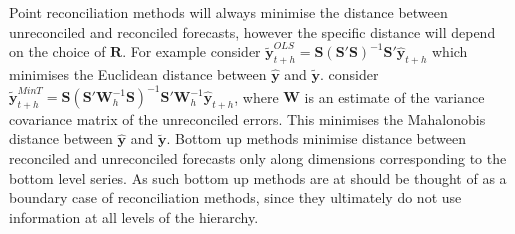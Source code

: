 \documentclass[a4paper, 11pt]{article}
\theoremstyle{theo}
\theoremstyle{definition}
\begin{document}
Point reconciliation methods will always minimise the distance between unreconciled and reconciled forecasts, however the specific distance will depend on the choice of ${\bm R}$.  For example \cite{Hyndman2011} consider $\tilde{\bm{y}}^{OLS}_{t+h}=\bm{S}(\bm{S}' \bm{S})^{-1}\bm{S}' \hat{\bm{y}}_{t+h}$ which minimises the Euclidean distance between $\hat{\bm y}$ and $\tilde{\bm y}$. \cite{Wickramasuriya2017} consider $\tilde{\bm{y}}^{MinT}_{t+h}=\bm{S}(\bm{S}' \bm{W}^{-1}_{h}\bm{S})^{-1}\bm{S}'\bm{W}^{-1}_{h} \hat{\bm{y}}_{t+h}$, where ${\bm W}$ is an estimate of the variance covariance matrix of the unreconciled errors.  This 
minimises the Mahalonobis distance between $\hat{\bm y}$ and $\tilde{\bm y}$.  Bottom up methods minimise distance between reconciled and unreconciled forecasts only along dimensions corresponding to the bottom level series.  As such bottom up methods are at should be thought of as a boundary case of reconciliation methods, since they ultimately do not use information at all levels of the hierarchy. 


%
\end{document}
